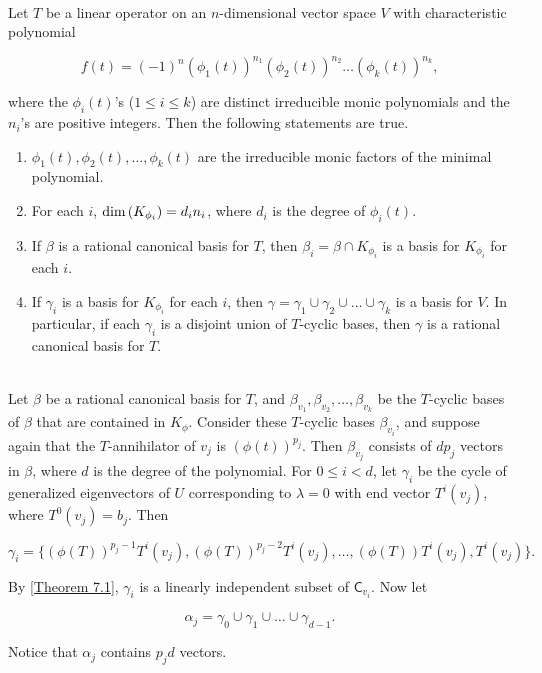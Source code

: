 \begin{theorem}
	\hfill\\
	Let $T$ be a linear operator on an $n$-dimensional vector space $V$ with characteristic polynomial

	\[f(t) = (-1)^n(\phi_1(t))^{n_1} (\phi_2(t))^{n_2} \dots (\phi_k(t))^{n_k},\]

	where the $\phi_i(t)$'s ($1 \leq i \leq k$) are distinct irreducible monic polynomials and the $n_i$'s are positive integers. Then the following statements are true.

	\begin{enumerate}
		\item $\phi_1(t), \phi_2(t), \dots, \phi_k(t)$ are the irreducible monic factors of the minimal polynomial.
		\item For each $i$, $\text{dim}\left(K_{\phi_i}\right) = d_in_i$, where $d_i$ is the degree of $\phi_i(t)$.
		\item If $\beta$ is a rational canonical basis for $T$, then $\beta_i = \beta \cap K_{\phi_i}$ is a basis for $K_{\phi_i}$ for each $i$.
		\item If $\gamma_i$ is a basis for $K_{\phi_i}$ for each $i$, then $\gamma = \gamma_1 \cup \gamma_2 \cup \dots \cup \gamma_k$ is a basis for $V$. In particular, if each $\gamma_i$ is a disjoint union of $T$-cyclic bases, then $\gamma$ is a rational canonical basis for $T$.
	\end{enumerate}
\end{theorem}

\begin{definition}
	\hfill\\
	Let $\beta$ be a rational canonical basis for $T$, and $\beta_{v_1}, \beta_{v_2}, \dots, \beta_{v_k}$ be the $T$-cyclic bases of $\beta$ that are contained in $K_\phi$. Consider these $T$-cyclic bases $\beta_{v_i}$, and suppose again that the $T$-annihilator of $v_j$ is $(\phi(t))^{p_j}$. Then $\beta_{v_j}$ consists of $dp_j$ vectors in $\beta$, where $d$ is the degree of the polynomial. For $0 \leq i < d$, let $\gamma_i$ be the cycle of generalized eigenvectors of $U$ corresponding to $\lambda = 0$ with end vector $T^i(v_j)$, where $T^0(v_j) = b_j$. Then

	\[\gamma_i = \{(\phi(T))^{p_j-1}T^i(v_j), (\phi(T))^{p_j-2}T^i(v_j), \dots, (\phi(T))T^i(v_j),T^i(v_j)\}.\]

	By \autoref{Theorem 7.1}, $\gamma_i$ is a linearly independent subset of $\mathsf{C}_{v_i}$. Now let

	\[\alpha_j = \gamma_0 \cup \gamma_1 \cup \dots \cup \gamma_{d - 1}.\]

	Notice that $\alpha_j$ contains $p_jd$ vectors.
\end{definition}

